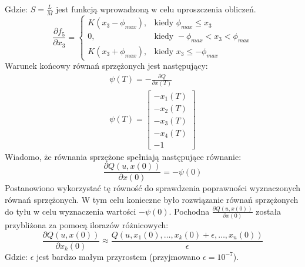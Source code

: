 \noindent Gdzie:\newline
\(S=\frac{L}{M}\) jest funkcją wprowadzoną w celu uproszczenia obliczeń.
\begin{equation}
\frac{\partial f_5}{\partial x_3}=
	\begin{cases}
	K(x_3-\phi_{max}), & \text{kiedy } \phi_{max}\leqslant x_3\\
	0, & \text{kiedy } -\phi_{max}<x_3<\phi_{max}\\
	K(x_3+\phi_{max}), & \text{kiedy } x_3\leqslant -\phi_{max}
	\end{cases}
\end{equation}
Warunek końcowy równań sprzężonych jest następujący:
\begin{equation}
\begin{aligned}
\psi(T)=-\frac{\partial Q}{\partial x(T)}\\
\psi(T)=\begin{bmatrix}
-x_1(T)\\
-x_2(T)\\
-x_3(T)\\
-x_4(T)\\
-1
\end{bmatrix}
\end{aligned}
\end{equation}
Wiadomo, że równania sprzężone spełniają następujące równanie:
\begin{equation}
\frac{\partial Q(u,x(0))}{\partial x(0)}=-\psi(0)
\label{eq:check_psi}
\end{equation}
Postanowiono wykorzystać tę równość do sprawdzenia poprawności wyznaczonych równań sprzężonych. W tym celu konieczne było rozwiązanie równań sprzężonych do tyłu w celu wyznaczenia wartości \(-\psi(0)\). Pochodna \(\frac{\partial Q(u,x(0))}{\partial x(0)}\) została przybliżona za pomocą ilorazów różnicowych:
\begin{equation}
\frac{\partial Q(u,x(0))}{\partial x_k(0)}\approx\frac{Q(u,x_1(0),\dots, x_k(0)+\epsilon,\dots,x_n(0))}{\epsilon}
\end{equation}
\noindent Gdzie:\newline
\(\epsilon\) jest bardzo małym przyrostem (przyjmowano \(\epsilon=10^{-7}\)).
